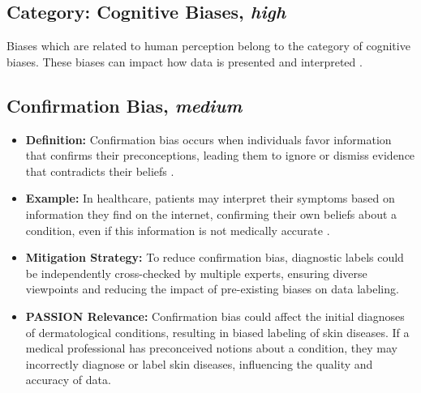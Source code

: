 \documentclass[12pt, a4paper, oneside]{book}   	%
\begin{document}
\begin{appendices}
		\section{Category: Cognitive Biases, \textit{high}} \label{app:biasCategoryCognitiveBiasesHigh}
		Biases which are related to human perception belong to the category of cognitive biases. These biases can impact how data is presented and interpreted \autocite{Mester_2017}.
		
		\subsection{Confirmation Bias, \textit{medium}}
		\begin{itemize}
			\item \textbf{Definition:} Confirmation bias occurs when individuals favor information that confirms their preconceptions, leading them to ignore or dismiss evidence that contradicts their beliefs \autocite{Mester_2017}.
			\item \textbf{Example:} In healthcare, patients may interpret their symptoms based on information they find on the internet, confirming their own beliefs about a condition, even if this information is not medically accurate \autocite{Chakraborty_2024, c15, c14}.
			\item \textbf{Mitigation Strategy:} To reduce confirmation bias, diagnostic labels could be independently cross-checked by multiple experts, ensuring diverse viewpoints and reducing the impact of pre-existing biases on data labeling.
			\item \textbf{PASSION Relevance:} Confirmation bias could affect the initial diagnoses of dermatological conditions, resulting in biased labeling of skin diseases. If a medical professional has preconceived notions about a condition, they may incorrectly diagnose or label skin diseases, influencing the quality and accuracy of data.
		\end{itemize}
		

\end{appendices}
\end{document}

